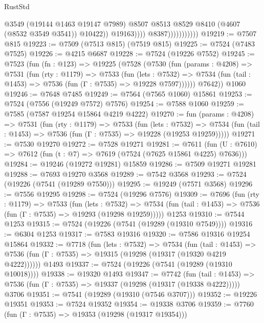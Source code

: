 \begin{lexlean}{RustStd}
\begin{coremodule}
                                      @3549
                                      (@19144 @1463 @19147 @7989)
                                      @8507
                                      @8513
                                      @8529
                                      @8410
                                      (@4607 (@8532 @3549 @3541))
                                      @10422))
                                  @19163))))
                          @8387)))))))))))
@19219 := @7507 @815
@19223 := @7509 (@7513 @815) (@7519 @815)
@19225 := @7524 (@7483 @7525)
@19226 := @4215 @6687
@19228 := @7524 (@19226 @7552)
@19245 := @7523
    (fun (fn : @123) =>
    @19225
      (@7528
        (@7530
          (fun (params : @4208) =>
          @7531
            (fun (rty : @1179) =>
            @7533
              (fun (lets : @7532) =>
              @7534 (fun (tail : @1453) => @7536 (fun (Γ : @7535) => @19228 @7597))))))
        @7642))
    @1060
@19246 := @7648 @7485
@19249 := @7564 (@7565 @1060) @15861
@19253 := @7524 (@7556 (@19249 @7572) @7576)
@19254 := @7588 @1060
@19259 := @7585 (@7587 @19254 @15864 @4219 @4222)
@19270 := fun (params : @4208) =>
  @7531
    (fun (rty : @1179) =>
    @7533
      (fun (lets : @7532) =>
      @7534 (fun (tail : @1453) => @7536 (fun (Γ : @7535) => @19228 (@19253 @19259)))))
@19271 := @7530 @19270
@19272 := @7528 @19271
@19281 := @7611
    (fun (U : @7610) => @7612 (fun (t : @7) => @7619 (@7524 (@7625 @15861 @4225) @7636)))
@19284 := @19246 (@19272 @19281) @15859
@19286 := @7509 @19271 @19281
@19288 := @7693 @19270 @3568
@19289 := @7542 @3568
@19293 := @7524 (@19226 (@7541 (@19289 @7550)))
@19295 := @19249 (@7571 @3568)
@19296 := @7556 @19295
@19298 := @7524 (@19296 @7576)
@19309 := @7696
    (fun (rty : @1179) =>
    @7533
      (fun (lets : @7532) =>
      @7534 (fun (tail : @1453) => @7536 (fun (Γ : @7535) => @19293 (@19298 @19259)))))
    @1253
@19310 := @7544 @1253
@19315 := @7524 (@19226 (@7541 (@19289 (@19310 @7549))))
@19316 := @6304 @1253
@19317 := @7583 @19316
@19320 := @7586 @19316 @19254 @15864
@19332 := @7718
    (fun (lets : @7532) =>
    @7534
      (fun (tail : @1453) =>
      @7536 (fun (Γ : @7535) => @19315 (@19298 (@19317 (@19320 @4219 @4222))))))
    @1493
@19337 := @7524 (@19226 (@7541 (@19289 (@19310 @10018))))
@19338 := @19320 @1493
@19347 := @7742
    (fun (tail : @1453) => @7536 (fun (Γ : @7535) => @19337 (@19298 (@19317 (@19338 @4222)))))
    @3706
@19351 := @7541 (@19289 (@19310 (@7546 @3707)))
@19352 := @19226 @19351
@19353 := @7524 @19352
@19354 := @19338 @3706
@19359 := @7760 (fun (Γ : @7535) => @19353 (@19298 (@19317 @19354)))

\end{coremodule}
\end{lexlean}
